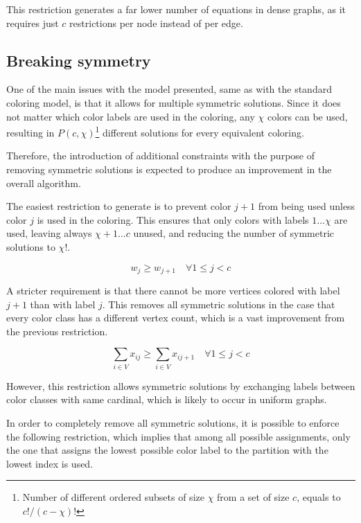 This restriction generates a far lower number of equations in dense graphs, as it requires just $c$ restrictions per node instead of per edge.

\subsection{Breaking symmetry}
\label{subsec:model:symmetry}

One of the main issues with the model presented, same as with the standard coloring model, is that it allows for multiple symmetric solutions. Since it does not matter which color labels are used in the coloring, any $\chi$ colors can be used, resulting in $P(c,\chi)$\footnote{Number of different ordered subsets of size $\chi$ from a set of size $c$, equals to $c! / (c - \chi)!$} different solutions for every equivalent coloring.

Therefore, the introduction of additional constraints with the purpose of removing symmetric solutions is expected to produce an improvement in the overall algorithm.

The easiest restriction to generate is to prevent color $j+1$ from being used unless color $j$ is used in the coloring. This ensures that only colors with labels $1 \ldots \chi$ are used, leaving always $\chi+1 \ldots c$ unused, and reducing the number of symmetric solutions to $\chi!$.

\begin{equation}
\label{eqn:lowerlabel}
w_j \geq w_{j+1} \quad \forall 1 \leq j < c 
\end{equation}

A stricter requirement is that there cannot be more vertices colored with label $j+1$ than with label $j$. This removes all symmetric solutions in the case that every color class has a different vertex count, which is a vast improvement from the previous restriction.

\begin{equation}
\label{eqn:symnodecount}
\sum_{i \in V} x_{ij} \geq \sum_{i \in V} x_{ij+1} \quad \forall 1 \leq j < c 
\end{equation}

However, this restriction allows symmetric solutions by exchanging labels between color classes with same cardinal, which is likely to occur in uniform graphs. 

In order to completely remove all symmetric solutions, it is possible to enforce the following restriction, which implies that among all possible assignments, only the one that assigns the lowest possible color label to the partition with the lowest index is used. 

